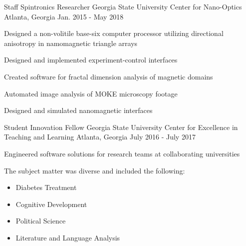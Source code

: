 \begin{cventries}
\cventry
{Staff Spintronics Researcher} %
{Georgia State University Center for Nano-Optics} %
{Atlanta, Georgia} %
{Jan. 2015 - May 2018} %
{ %
\begin{cvitems}
\item {Designed a non-volitile base-six computer processor utilizing directional anisotropy in namomagnetic \newline triangle arrays}
\item {Designed and implemented experiment-control interfaces}
\item {Created software for fractal dimension analysis of magnetic domains}
\item {Automated image analysis of MOKE microscopy footage}
\item {Designed and simulated nanomagnetic interfaces}
\end{cvitems} 
}


\cventry
{Student Innovation Fellow} %
{Georgia State University Center for Excellence in Teaching and Learning} %
{Atlanta, Georgia} %
{July 2016 - July 2017} %
{ %
\begin{cvitems}
\item {Engineered software solutions for research teams at collaborating universities}
\item {The subject matter was diverse and included the following:}
\begin{itemize}
\item{Diabetes Treatment}
\item{Cognitive Development}
\item{Political Science}
\item{Literature and Language Analysis}
\end{itemize}
\end{cvitems}
}


\end{cventries}
